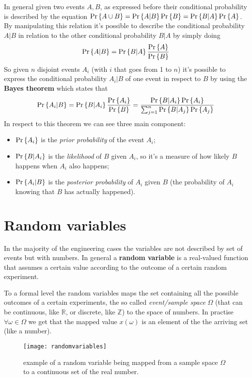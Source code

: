 	In general given two events $A,B$, as expressed before their conditional probability is described by the equation $\textrm{Pr}\left\{ A \cup B \right\} = \textrm{Pr}\left\{ A|B \right\} \textrm{Pr}\left\{ B \right\} = \textrm{Pr}\left\{ B|A \right\} \textrm{Pr}\left\{ A \right\}$. By manipulating this relation it's possible to describe the conditional probability $A|B$ in relation to the other conditional probability $B|A$ by simply doing
	\[\textrm{Pr}\left\{ A|B \right\} = \textrm{Pr}\left\{ B|A \right\} \frac{\textrm{Pr}\left\{ A \right\}}{\textrm{Pr}\left\{ B \right\}} \]
	So given $n$ disjoint events $A_i$ (with $i$ that goes from 1 to $n$) it's possible to express the conditional probability $A_i|B$ of one event in respect to $B$ by using the \textbf{Bayes theorem} which states that
	\[ \textrm{Pr}\left\{ A_i|B \right\}  = \textrm{Pr}\left\{ B|A_i \right\} \frac{\textrm{Pr}\left\{ A_i \right\}}{\textrm{Pr}\left\{ B \right\}} =  \frac{\textrm{Pr}\left\{ B|A_i \right\} \textrm{Pr}\left\{ A_i \right\}}{\sum_{j=1}^n \textrm{Pr}\left\{ B|A_j \right\}\textrm{Pr}\left\{ A_j \right\}} \]
	In respect to this theorem we can see three main component:
	\begin{itemize}
		\item $\textrm{Pr}\left\{ A_i \right\}$ is the \textit{prior probability} of the event $A_i$;
		\item $\textrm{Pr}\left\{ B|A_i \right\}$ is the \textit{likelihood} of $B$ given $A_i$, so it's a measure of how likely $B$ happens when $A_i$ also happens;
		\item $\textrm{Pr}\left\{ A_i|B \right\}$ is the \textit{posterior probability} of $A_i$ given $B$ (the probability of $A_i$ knowing that $B$ has actually happened).
	\end{itemize}

\section*{Random variables}
	In the majority of the engineering cases the variables are not described by set of events but with numbers. In general a \textbf{random variable} is a real-valued function that assumes a certain value according to the outcome of a certain random experiment.
	
	To a formal level the random variables maps the set containing all the possible outcomes of a certain experiments, the so called \textit{event/sample space} $\Omega$ (that can be continuous, like $\mathds R$, or discrete, like $\mathds Z$) to the space of numbers. In practise $\forall \omega \in \Omega$ we get that the mapped value $x(\omega)$ is an element of the the arriving set (like a number).	
	\begin{SCfigure}[1.5][bht]
		\texttt{[image: randomvariables]}
		\caption{example of a random variable being mapped from a sample space $\Omega$ to a continuous set of the real number.}
	\end{SCfigure}
	
